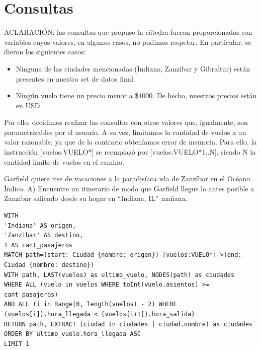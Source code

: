 \documentclass[a4paper,11pt]{article}
\begin{document}
\newpage
\section*{Consultas}
ACLARACIÓN: las consultas que propuso la cátedra fueron proporcionadas con variables cuyos valores, en algunos casos, no pudimos respetar. En particular, se dieron los siguientes casos:
\begin{itemize}
\item Ninguna de las ciudades mencionadas (Indiana, Zanzibar y Gibraltar) están presentes en nuestro set de datos final.
\item Ningún vuelo tiene un precio menor a \$4000. De hecho, nuestros precios están en USD.
\end{itemize}
    
Por ello, decidimos realizar las consultas con otros valores que, igualmente, son parametrizables por el usuario.
A su vez, limitamos la cantidad de vuelos a un valor razonable, ya que de lo contrario obteníamos error de memoria.
Para ello, la instrucción [vuelos:VUELO*] se reemplazó por [vuelos:VUELO*1..N], siendo N la cantidad límite de vuelos en el camino.

Garfield quiere irse de vacaciones a la paradisíaca isla de Zanzíbar en el Océano Índico.
A) Encuentre un itinerario de modo que Garfield llegue lo antes posible a Zanzibar saliendo desde su hogar en “Indiana, IL” mañana.
\begin{lstlisting}[style=neo4j]
WITH
'Indiana' AS origen,
'Zanzibar' AS destino,
1 AS cant_pasajeros
MATCH path=(start: Ciudad {nombre: origen})-[vuelos:VUELO*]->(end:
Ciudad {nombre: destino})
WITH path, LAST(vuelos) as ultimo_vuelo, NODES(path) as ciudades
WHERE ALL (vuelo in vuelos WHERE toInt(vuelo.asientos) >=
cant_pasajeros)
AND ALL (i in Range(0, length(vuelos) - 2) WHERE 
(vuelos[i]).hora_llegada < (vuelos[i+1]).hora_salida)
RETURN path, EXTRACT (ciudad in ciudades | ciudad.nombre) as ciudades
ORDER BY ultimo_vuelo.hora_llegada ASC
LIMIT 1
\end{lstlisting}
\end{document}
